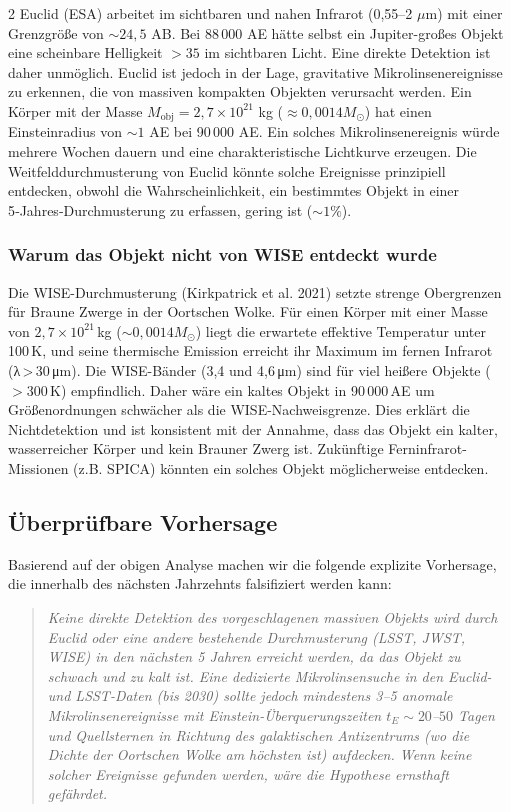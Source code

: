 \documentclass[11pt,a4paper]{article}
\begin{document}
\begin{multicols}{2}
		Euclid (ESA) arbeitet im sichtbaren und nahen Infrarot (0,55–2 \(\mu\)m) mit einer Grenzgröße von \(\sim 24,5\) AB. Bei 88\,000 AE hätte selbst ein Jupiter-großes Objekt eine scheinbare Helligkeit \(>35\) im sichtbaren Licht. Eine direkte Detektion ist daher unmöglich. Euclid ist jedoch in der Lage, gravitative Mikrolinsenereignisse zu erkennen, die von massiven kompakten Objekten verursacht werden. Ein Körper mit der Masse \(M_{\text{obj}} = 2,7\times10^{21}\) kg (\(\approx 0,0014 M_{\odot}\)) hat einen Einsteinradius von \(\sim 1\) AE bei 90\,000 AE. Ein solches Mikrolinsenereignis würde mehrere Wochen dauern und eine charakteristische Lichtkurve erzeugen. Die Weitfelddurchmusterung von Euclid könnte solche Ereignisse prinzipiell entdecken, obwohl die Wahrscheinlichkeit, ein bestimmtes Objekt in einer 5‑Jahres‑Durchmusterung zu erfassen, gering ist (\(\sim 1\%\)).
		
		\subsubsection{Warum das Objekt nicht von WISE entdeckt wurde}
		
		Die WISE-Durchmusterung (Kirkpatrick et al. 2021) setzte strenge Obergrenzen für Braune Zwerge in der Oortschen Wolke. Für einen Körper mit einer Masse von \(2,7\times10^{21}\) kg (\(\sim 0,0014 M_{\odot}\)) liegt die erwartete effektive Temperatur unter 100 K, und seine thermische Emission erreicht ihr Maximum im fernen Infrarot (λ > 30 μm). Die WISE-Bänder (3,4 und 4,6 μm) sind für viel heißere Objekte (\(>300\) K) empfindlich. Daher wäre ein kaltes Objekt in 90\,000 AE um Größenordnungen schwächer als die WISE-Nachweisgrenze. Dies erklärt die Nichtdetektion und ist konsistent mit der Annahme, dass das Objekt ein kalter, wasserreicher Körper und kein Brauner Zwerg ist. Zukünftige Ferninfrarot-Missionen (z.B. SPICA) könnten ein solches Objekt möglicherweise entdecken.
		
		\subsection{Überprüfbare Vorhersage}
		
		Basierend auf der obigen Analyse machen wir die folgende explizite Vorhersage, die innerhalb des nächsten Jahrzehnts falsifiziert werden kann:
		
		\begin{quote}
			\itshape
			Keine direkte Detektion des vorgeschlagenen massiven Objekts wird durch Euclid oder eine andere bestehende Durchmusterung (LSST, JWST, WISE) in den nächsten 5 Jahren erreicht werden, da das Objekt zu schwach und zu kalt ist. Eine dedizierte Mikrolinsensuche in den Euclid- und LSST-Daten (bis 2030) sollte jedoch mindestens 3–5 anomale Mikrolinsenereignisse mit Einstein-Überquerungszeiten \(t_E \sim 20\)–\(50\) Tagen und Quellsternen in Richtung des galaktischen Antizentrums (wo die Dichte der Oortschen Wolke am höchsten ist) aufdecken. Wenn keine solcher Ereignisse gefunden werden, wäre die Hypothese ernsthaft gefährdet.
		\end{quote}
		
	\end{multicols}
	
\end{document}
